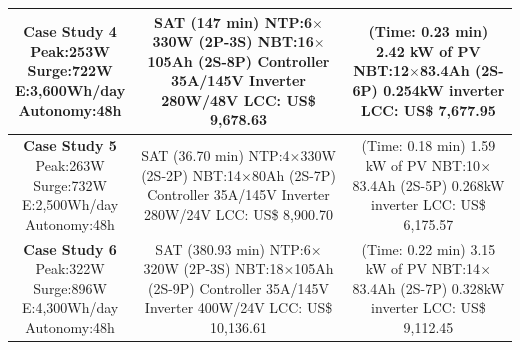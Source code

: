 \documentclass[journal]{IEEEtran}
\begin{document}
\begin{table}
\begin{scriptsize}
\begin{tabular}{c|c|c}
\hline
\makecell{\textbf{Case Study 4}\\Peak:253W\\Surge:722W\\E:3,600Wh/day\\Autonomy:48h} & \makecell{SAT (147 min) \\NTP:6$\times$330W (2P-3S)\\NBT:16$\times$105Ah (2S-8P)\\Controller 35A/145V\\Inverter 280W/48V\\LCC: US\$ 9,678.63} & \makecell{(Time: 0.23 min)\\2.42 kW of PV\\NBT:12$\times$83.4Ah (2S-6P)\\0.254kW inverter\\LCC: US\$ 7,677.95}\\
\hline
\makecell{\textbf{Case Study 5}\\Peak:263W\\Surge:732W\\E:2,500Wh/day\\Autonomy:48h} &  \makecell {SAT (36.70 min) \\NTP:4$\times$330W (2S-2P)\\NBT:14$\times$80Ah (2S-7P)\\Controller 35A/145V\\Inverter 280W/24V \\LCC: US\$ 8,900.70} & \makecell{(Time: 0.18 min)\\1.59 kW of PV\\NBT:10$\times$83.4Ah (2S-5P)\\0.268kW inverter\\LCC: US\$ 6,175.57} \\
\hline
\makecell{\textbf{Case Study 6}\\Peak:322W\\Surge:896W\\E:4,300Wh/day\\Autonomy:48h} &  \makecell {SAT (380.93 min) \\NTP:6$\times$320W (2P-3S)\\NBT:18$\times$105Ah (2S-9P)\\Controller 35A/145V\\Inverter 400W/24V \\LCC: US\$ 10,136.61} & \makecell{(Time: 0.22 min)\\3.15 kW of PV\\NBT:14$\times$83.4Ah (2S-7P)\\0.328kW inverter\\LCC: US\$ 9,112.45} \\

\end{tabular}
\end{scriptsize}
\end{table}
\end{document}
